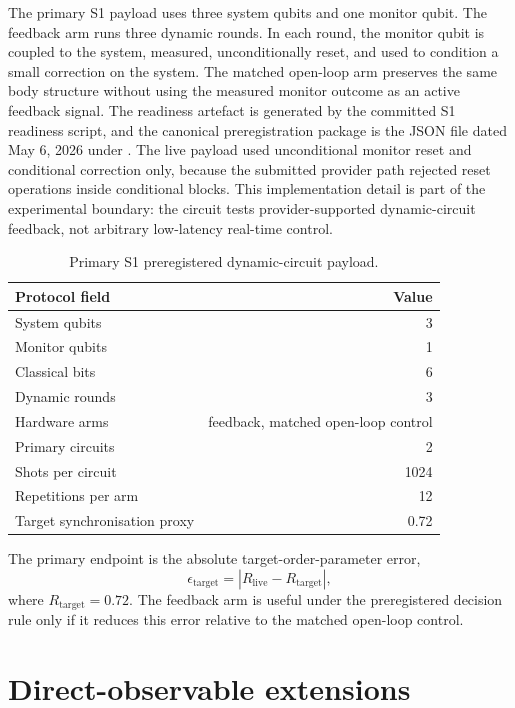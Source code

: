 \documentclass[preprint,aps,physrev,superscriptaddress,floatfix,longbibliography]{revtex4-2}
\begin{document}
The primary S1 payload uses three system qubits and one monitor qubit. The
feedback arm runs three dynamic rounds. In each round, the monitor qubit is
coupled to the system, measured, unconditionally reset, and used to condition a
small correction on the system. The matched open-loop arm preserves the same
body structure without using the measured monitor outcome as an active
feedback signal. The readiness artefact is generated by the committed S1
readiness script, and the canonical preregistration package is the JSON file
dated May 6, 2026 under .
The live payload used unconditional monitor reset and conditional correction
only, because the submitted provider path rejected reset operations inside
conditional blocks. This implementation detail is part of the experimental
boundary: the circuit tests provider-supported dynamic-circuit feedback, not
arbitrary low-latency real-time control.

\begin{table}[tb]
\centering
\begin{tabular}{lr}
\toprule
Protocol field & Value \\
\midrule
System qubits & 3 \\
Monitor qubits & 1 \\
Classical bits & 6 \\
Dynamic rounds & 3 \\
Hardware arms & feedback, matched open-loop control \\
Primary circuits & 2 \\
Shots per circuit & 1024 \\
Repetitions per arm & 12 \\
Target synchronisation proxy & 0.72 \\
\bottomrule
\end{tabular}
\caption{Primary S1 preregistered dynamic-circuit payload.}
\label{tab:protocol}
\end{table}

The primary endpoint is the absolute target-order-parameter error,
\begin{equation}
    \epsilon_{\mathrm{target}} = |R_{\mathrm{live}} - R_{\mathrm{target}}|,
\end{equation}
where $R_{\mathrm{target}}=0.72$. The feedback arm is useful under the
preregistered decision rule only if it reduces this error relative to the
matched open-loop control.

\section{Direct-observable extensions}
\end{document}
